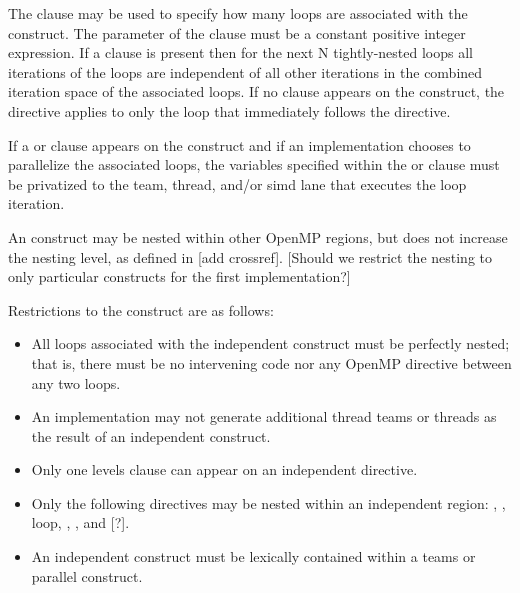 The  clause may be used to specify how many loops are associated with the
 construct. The parameter of the  clause must be
a constant positive integer expression. If a  clause is present then for the next N
tightly-nested loops all iterations of the loops are independent of all other
iterations in the combined iteration space of the associated loops. If no
 clause appears on the construct, the  directive
applies to only the loop that immediately follows the directive.

If a  or  clause appears on the
 construct and if
an implementation chooses to parallelize the associated loops, the variables
specified within the  or  clause must be privatized to the team, thread,
and/or simd lane that executes the loop iteration.

An  construct may be nested within other OpenMP regions, but does
not increase the nesting level, as defined in [add crossref]. [Should we
restrict the nesting to only particular constructs for the first
implementation?]

\restrictions
Restrictions to the  construct are as follows:

\begin{itemize}
  \item All loops associated with the independent construct must be perfectly
    nested; that is, there must be no intervening code nor any OpenMP directive
    between any two loops.
    
  \item An implementation may not generate additional thread teams or threads
    as the result of an independent construct.

  \item Only one levels clause can appear on an independent directive.
  
  \item Only the following directives may be nested within an independent
    region: , , loop, , 
    , and [?]. %
    
  \item An independent construct must be lexically contained within a teams or
    parallel construct. 

\end{itemize}

